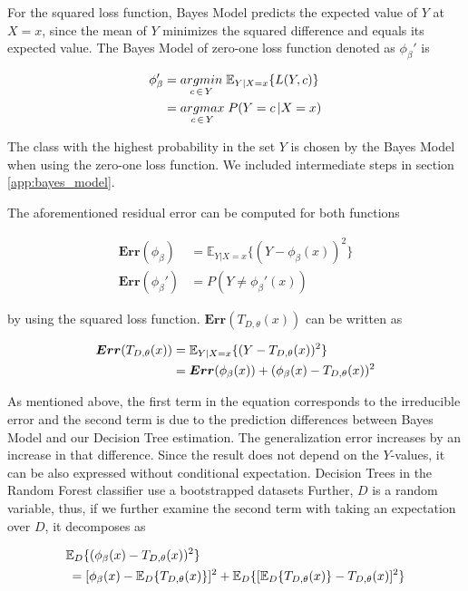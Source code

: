 For the squared loss function, Bayes Model predicts the expected value of $Y$ at $X=x$,
since the mean of $Y$ minimizes the squared difference 
and equals its expected value.
The Bayes Model of zero-one loss function denoted as $\phi_{\beta}'$ is

\begin{align}\label{eq:bayes_model}
\phi_{\beta}' & = \underset{c \,\in\, Y}{argmin} \; \mathbb{E}_{Y|X=x}\{L(Y,c) \} \notag\\
			 & = \underset{c \,\in\, Y}{argmax} \; P(Y = c \,| X = x)
\end{align}

The class with the highest probability in the set $Y$ is chosen by the Bayes Model when using the zero-one loss function.
We included intermediate steps in section \ref{app:bayes_model}. 

The aforementioned residual error can be computed for both functions

\begin{align}
\boldsymbol{Err}(\phi_{\beta}) & = \mathbb{E}_{Y|X=x}\{(Y-\phi_{\beta}(x))^2 \}\\
\boldsymbol{Err}(\phi_{\beta}') & = P(Y \neq \phi_{\beta}'(x) )
\end{align}

by using the squared loss function. $\boldsymbol{Err}(T_{D,\theta}(x))$ can be written as

\begin{align}\label{eq:decomp_squared_loss}
\boldsymbol{Err}(T_{D, \theta}(x)) & = \mathbb{E}_{Y|X=x}\{(Y-T_{D,\theta}(x))^2\} \notag \\
							   	  & = \boldsymbol{Err}(\phi_{\beta}(x)) + (\phi_{\beta}(x)-T_{D,\theta}(x))^2
\end{align}

As mentioned above, the first term in the equation corresponds to the 
irreducible error and the second term is due to the prediction differences between Bayes Model and our Decision Tree estimation. 
The generalization error increases by an increase in that difference. Since the result does not depend on the $Y$-values, 
it can be also expressed without conditional expectation. 
Decision Trees in the Random Forest classifier use a bootstrapped datasets
Further, $D$ is a random variable, thus, if we further examine the second term with taking an expectation over $D$, 
it decomposes as

\begin{align}\label{eq:decomp_squared_loss_cont}
	& \mathbb{E}_{D}\{(\phi_{\beta}(x) - T_{D,\theta}(x))^2 \} \notag \\
	& \: = [\phi_{\beta}(x) - \mathbb{E}_{D}\{T_{D,\theta}(x)\}]^2 + 
	\mathbb{E}_{D}\{[\mathbb{E}_{D}\{T_{D,\theta}(x)\} - T_{D,\theta}(x)]^2\}
\end{align}

